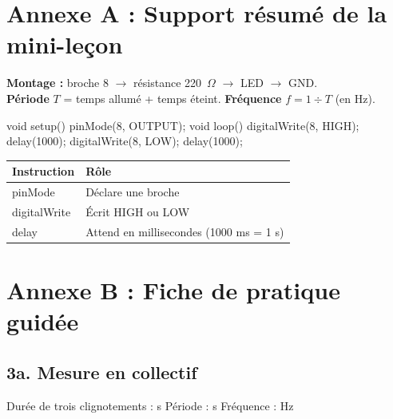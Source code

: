 \documentclass[11pt,a4paper]{article}
\begin{document}

\newpage
\section*{Annexe A : Support résumé de la mini-leçon}

\begin{tcolorbox}[colback=yellow!10,colframe=yellow!50!black]
\textbf{Montage :} broche 8 $\rightarrow$ résistance 220~$\Omega$ $\rightarrow$ LED $\rightarrow$ GND.\\
\textbf{Période} $T$ = temps allumé + temps éteint. \textbf{Fréquence} $f = 1 \div T$ (en Hz).
\end{tcolorbox}

\begin{arduino}[Modèle]
void setup() {
  pinMode(8, OUTPUT);
}
void loop() {
  digitalWrite(8, HIGH);
  delay(1000);
  digitalWrite(8, LOW);
  delay(1000);
}
\end{arduino}

\begin{tabularx}{\linewidth}{>{\ttfamily}p{3.6cm}Y}
\toprule
Instruction & Rôle\\
\midrule
pinMode & Déclare une broche\\
digitalWrite & Écrit HIGH ou LOW\\
delay & Attend en millisecondes (1000 ms = 1 s)\\
\bottomrule
\end{tabularx}

\newpage
\section*{Annexe B : Fiche de pratique guidée}

\subsection*{3a. Mesure en collectif}
Durée de trois clignotements : \dotfill{} s \quad Période : \dotfill{} s \quad Fréquence : \dotfill{} Hz
\end{document}
